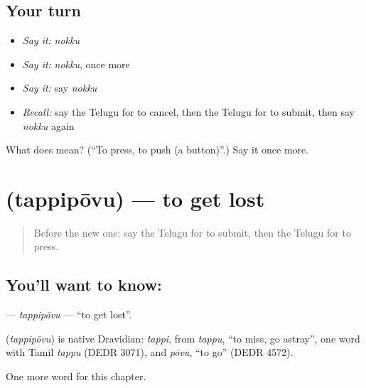 \subsection*{Your turn}
\begin{itemize}
\raggedright
  \item \emph{Say it:} \emph{nokku}
  \item \emph{Say it:} \emph{nokku}, once more
  \item \emph{Say it:} say \emph{nokku}
  \item \emph{Recall:} say the Telugu for to cancel, then the Telugu for to submit, then say \emph{nokku} again
\end{itemize}

\begin{tcolorbox}[breakable,colback=teal!4,colframe=teal!35!black,title={Before you move on}]
What does  mean? (\textquotedblleft{}To press, to push (a button)\textquotedblright{}.) Say it once more.
\end{tcolorbox}
\section[\texorpdfstring{\te{తప్పిపోవు} (tappipōvu)}{తప్పిపోవు (tappipōvu)}]{ (tappipōvu) — to get lost}

\label{lesson:TE-C281-tappipovu}



\begin{quote}
Before the new one: say the Telugu for to submit, then the Telugu for to press.
\end{quote}

\subsection*{You'll want to know: }
\textbf{} — \emph{tappipōvu} — \textquotedblleft{}to get lost\textquotedblright{}.

\begin{cousinweb}
\textbf{} (\emph{tappipōvu}) is native Dravidian: \emph{tappi}, from \emph{tappu}, \textquotedblleft{}to miss, go astray\textquotedblright{}, one word with Tamil \emph{tappu} (DEDR 3071), and \emph{pōvu}, \textquotedblleft{}to go\textquotedblright{} (DEDR 4572).
\end{cousinweb}

\begin{grammarlens}[title={What you've built}]
One more word for this chapter.
\end{grammarlens}

